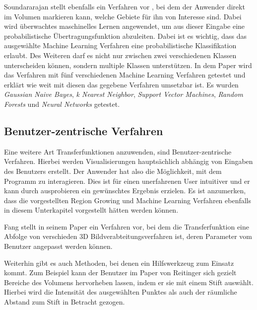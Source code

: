 Soundararajan stellt ebenfalls ein Verfahren vor \cite{soundararajan2015learning}, bei dem der Anwender direkt im Volumen markieren kann, welche Gebiete für ihn von Interesse sind.
Dabei wird überwachtes maschinelles Lernen angewendet, um aus dieser Eingabe eine probabilistische Übertragungsfunktion abzuleiten.
\newline
Dabei ist es wichtig, dass das ausgewählte Machine Learning Verfahren eine probabilistische Klassifikation erlaubt. Des Weiteren darf es nicht nur zwischen zwei verschiedenen Klassen unterscheiden können, sondern multiple Klassen unterstützen.
In dem Paper wird das Verfahren mit fünf verschiedenen Machine Learning Verfahren getestet und erklärt wie weit mit diesen das gegebene Verfahren umsetzbar ist. Es wurden \textit{Gaussian Naive Bayes}, \textit{k Nearest Neighbor}, \textit{Support Vector Machines}, \textit{Random Forests} und \textit{Neural Networks} getestet.



\subsection{Benutzer-zentrische Verfahren}

Eine weitere Art Transferfunktionen anzuwenden, sind Benutzer-zentrische Verfahren. Hierbei werden Visualisierungen hauptsächlich abhängig von Eingaben des Benutzers erstellt.
Der Anwender hat also die Möglichkeit, mit dem Programm zu interagieren. Dies ist für einen unerfahrenen User intuitiver und er kann durch ausprobieren ein gewünschtes Ergebnis erzielen.
Es ist anzumerken, dass die vorgestellten Region Growing und Machine Learning Verfahren ebenfalls in diesem Unterkapitel vorgestellt hätten werden können.


Fang stellt in seinem Paper \cite{fang1998image} ein Verfahren vor, bei dem die  Transferfunktion eine Abfolge von verschieden 3D Bildverabteitungsverfahren ist, deren Parameter vom Benutzer angepasst werden können.


Weiterhin gibt es auch Methoden, bei denen ein Hilfswerkzeug zum Einsatz kommt. Zum Beispiel kann der Benutzer im Paper von Reitinger \cite{reitinger2004user} sich gezielt Bereiche des Volumens hervorheben lassen, indem er sie mit einem Stift auswählt.
Hierbei wird die Intensität des ausgewählten Punktes als auch der räumliche Abstand zum Stift in Betracht gezogen.



